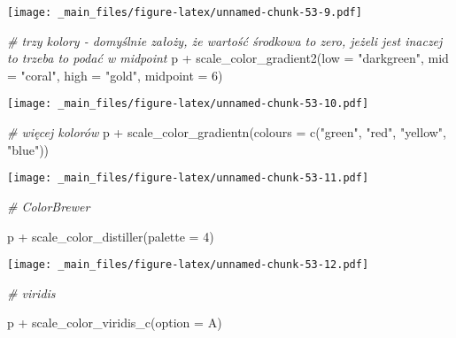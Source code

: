 \documentclass[
]{book}
\newenvironment{Shaded}{\begin{snugshade}}{\end{snugshade}}
\newcommand{\AttributeTok}[1]{\textcolor[rgb]{0.77,0.63,0.00}{#1}}
\newcommand{\CommentTok}[1]{\textcolor[rgb]{0.56,0.35,0.01}{\textit{#1}}}
\newcommand{\DecValTok}[1]{\textcolor[rgb]{0.00,0.00,0.81}{#1}}
\newcommand{\FunctionTok}[1]{\textcolor[rgb]{0.00,0.00,0.00}{#1}}
\newcommand{\NormalTok}[1]{#1}
\newcommand{\SpecialCharTok}[1]{\textcolor[rgb]{0.00,0.00,0.00}{#1}}
\newcommand{\StringTok}[1]{\textcolor[rgb]{0.31,0.60,0.02}{#1}}
\begin{document}
\texttt{[image: \_main\_files/figure-latex/unnamed-chunk-53-9.pdf]}

\begin{Shaded}
\begin{Highlighting}[]
\CommentTok{\# trzy kolory {-} domyślnie założy, że wartość środkowa to zero, jeżeli jest inaczej to trzeba to podać w midpoint}
\NormalTok{p }\SpecialCharTok{+} \FunctionTok{scale\_color\_gradient2}\NormalTok{(}\AttributeTok{low =} \StringTok{"darkgreen"}\NormalTok{, }\AttributeTok{mid =} \StringTok{"coral"}\NormalTok{, }\AttributeTok{high =} \StringTok{"gold"}\NormalTok{, }\AttributeTok{midpoint =} \DecValTok{6}\NormalTok{)}
\end{Highlighting}
\end{Shaded}

\texttt{[image: \_main\_files/figure-latex/unnamed-chunk-53-10.pdf]}

\begin{Shaded}
\begin{Highlighting}[]
\CommentTok{\# więcej kolorów}
\NormalTok{p }\SpecialCharTok{+} \FunctionTok{scale\_color\_gradientn}\NormalTok{(}\AttributeTok{colours =} \FunctionTok{c}\NormalTok{(}\StringTok{"green"}\NormalTok{, }\StringTok{"red"}\NormalTok{, }\StringTok{"yellow"}\NormalTok{, }\StringTok{"blue"}\NormalTok{))}
\end{Highlighting}
\end{Shaded}

\texttt{[image: \_main\_files/figure-latex/unnamed-chunk-53-11.pdf]}

\begin{Shaded}
\begin{Highlighting}[]
\CommentTok{\# ColorBrewer}

\NormalTok{p }\SpecialCharTok{+} \FunctionTok{scale\_color\_distiller}\NormalTok{(}\AttributeTok{palette =} \DecValTok{4}\NormalTok{)}
\end{Highlighting}
\end{Shaded}

\texttt{[image: \_main\_files/figure-latex/unnamed-chunk-53-12.pdf]}

\begin{Shaded}
\begin{Highlighting}[]
\CommentTok{\# viridis}

\NormalTok{p }\SpecialCharTok{+} \FunctionTok{scale\_color\_viridis\_c}\NormalTok{(}\AttributeTok{option =} \StringTok{\textquotesingle{}A\textquotesingle{}}\NormalTok{)}
\end{Highlighting}
\end{Shaded}
\end{document}
